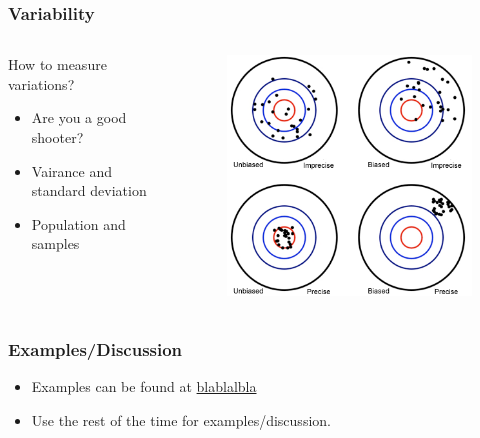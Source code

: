 \documentclass[10pt, compress]{beamer}
\begin{document}
\begin{frame}
    \frametitle{Variability}
    \begin{columns}
        \begin{block}{How to measure variations?}
            \begin{itemize}
                \item \alert{Are you a good shooter?}
                \item Vairance and standard deviation
                \item Population and samples
            \end{itemize}
        \end{block}
        \begin{block}{}
            \begin{figure}
                \begin{center}
                    \includegraphics[scale=0.4]{img/std_dvn.png}
                \end{center}
            \end{figure}
        \end{block}
    \end{columns}
\end{frame}

\begin{frame}
    \frametitle{Examples/Discussion}
    \begin{itemize}
        \item Examples can be found at \url{blablalbla}
        \item Use the rest of the time for examples/discussion.
    \end{itemize}
\end{frame}
\end{document}
